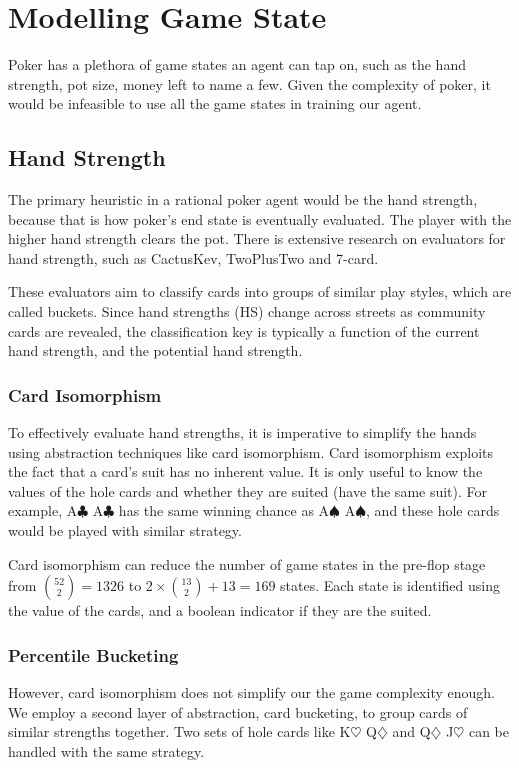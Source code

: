 \documentclass{article}
\begin{document}
\section{Modelling Game State}
Poker has a plethora of game states an agent can tap on, such as the hand strength, pot size, money left to name a few. Given the complexity of poker, it would be infeasible to use all the game states in training our agent.

\subsection{Hand Strength}
The primary heuristic in a rational poker agent would be the hand strength, because that is how poker's end state is eventually evaluated. The player with the higher hand strength clears the pot. There is extensive research on evaluators for hand strength, such as CactusKev, TwoPlusTwo and 7-card.

These evaluators aim to classify cards into groups of similar play styles, which are called buckets. Since hand strengths (HS) change across streets as community cards are revealed, the classification key is typically a function of the current hand strength, and the potential hand strength.

\subsubsection{Card Isomorphism}
To effectively evaluate hand strengths, it is imperative to simplify the hands using abstraction techniques like card isomorphism. Card isomorphism exploits the fact that a card's suit has no inherent value. It is only useful to know the values of the hole cards and whether they are suited (have the same suit). For example, A$\clubsuit$ A$\clubsuit$ has the same winning chance as A$\spadesuit$ A$\spadesuit$, and these hole cards would be played with similar strategy.

Card isomorphism can reduce the number of game states in the pre-flop stage from ${52 \choose 2} = 1326$ to $2 \times {13 \choose 2} + 13 = 169$ states. Each state is identified using the value of the cards, and a boolean indicator if they are the suited.

\subsubsection{Percentile Bucketing}
However, card isomorphism does not simplify our the game complexity enough. We employ a second layer of abstraction, card bucketing, to group cards of similar strengths together. Two sets of hole cards like K$\heartsuit$ Q$\diamondsuit$ and Q$\diamondsuit$ J$\heartsuit$ can be handled with the same strategy.
\end{document}
